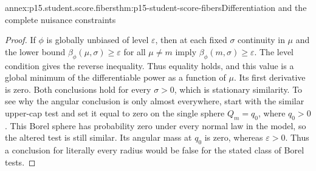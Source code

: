 \begin{annexitem}{annex:p15.student.score.fibers}{thm:p15-student-score-fibers}{Differentiation and the complete nuisance constraints}
\begin{proof}
If \(\phi\) is globally unbiased of level
\(\varepsilon\), then at each fixed \(\sigma\)
continuity in \(\mu\) and the lower bound
\(\beta_\phi(\mu,\sigma)\geq\varepsilon\) for
all \(\mu\ne m\) imply
\(\beta_\phi(m,\sigma)\geq\varepsilon\).
The level condition gives the reverse inequality.
Thus equality holds, and this value is a global
minimum of the differentiable power as a
function of \(\mu\). Its first derivative is
zero. Both conclusions hold for every
\(\sigma>0\), which is stationary similarity.
To see why the angular conclusion is only almost everywhere,
start with the similar upper-cap test and set it equal to
zero on the single sphere \(Q_m=q_0\), where \(q_0>0\).
This Borel sphere has probability zero under every normal
law in the model, so the altered test is still similar.
Its angular mass at \(q_0\) is zero, whereas
\(\varepsilon>0\). Thus a conclusion for literally every
radius would be false for the stated class of Borel tests.
\end{proof}
\end{annexitem}

